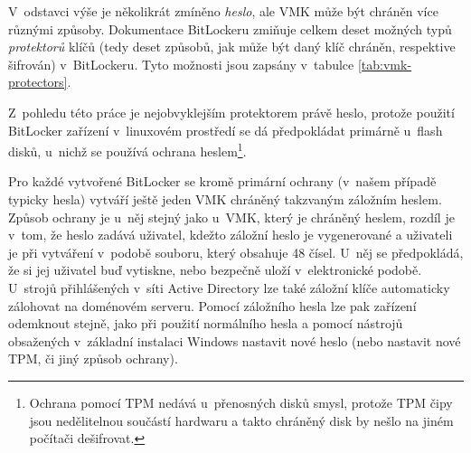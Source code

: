 V~odstavci výše je několikrát zmíněno \emph{heslo}, ale VMK může být chráněn více různými způsoby. Dokumentace BitLockeru \cite{Zxwr6wjYZUQ6z8Yo} zmiňuje celkem deset možných typů \emph{protektorů} klíčů (tedy deset způsobů, jak může být daný klíč chráněn, respektive šifrován) v~BitLockeru. Tyto možnosti jsou zapsány v~tabulce \ref{tab:vmk-protectors}.


Z~pohledu této práce je nejobvyklejším protektorem právě heslo, protože použití BitLocker zařízení v~linuxovém prostředí se dá předpokládat primárně u~flash disků, u~nichž se používá ochrana heslem\footnote{Ochrana pomocí TPM nedává u~přenosných disků smysl, protože TPM čipy jsou nedělitelnou součástí hardwaru a takto chráněný disk by nešlo na jiném počítači dešifrovat.}.

Pro každé vytvořené BitLocker se kromě primární ochrany (v~našem případě typicky hesla) vytváří ještě jeden VMK chráněný takzvaným záložním heslem. Způsob ochrany je u~něj stejný jako u~VMK, který je chráněný heslem, rozdíl je v~tom, že heslo zadává uživatel, kdežto záložní heslo je vygenerované a uživateli je při vytváření  v~podobě souboru, který obsahuje 48 čísel. U~něj se předpokládá, že si jej uživatel buď vytiskne, nebo bezpečně uloží v~elektronické podobě. U~strojů přihlášených v~síti Active Directory lze také záložní klíče automaticky zálohovat na doménovém serveru. Pomocí záložního hesla lze pak zařízení odemknout stejně, jako při použití normálního hesla a pomocí nástrojů obsažených v~základní instalaci Windows nastavit nové heslo (nebo nastavit nové TPM, či jiný způsob ochrany).\cite{Hall2019,MS2011}

